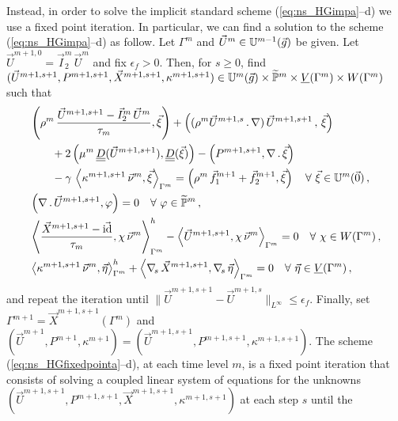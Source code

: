 Instead, in order to solve the implicit standard scheme (\ref{eq:ns_HGimpa}--d)
we use a fixed point iteration. In particular, we can find a solution
to the scheme (\ref{eq:ns_HGimpa}--d) as follow.
Let $\Gamma^m$ and $\vec U^m\in \uspacedisc{g}{m-1}$ be given.
Let $\vec U^{m+1,0}=\vec I^m_2\,\vec U^m$ and fix $\epsilon_f > 0$.
Then, for $s \geq 0$,
find $(\vec U^{m+1,s+1},P^{m+1,s+1}, \vec X^{m+1,s+1}, \kappa^{m+1,s+1}) \in
\uspacedisc{g}{m}\times \pnormspace^m \times \Vh \times \Wh$ such that
\begin{subequations}
\begin{align}
& \left( \rho^m\,\frac{\vec U^{m+1,s+1} - \vec I^m_2\,\vec U^m}{\tau_m}, \vec
\xi \right) + \left((\rho^m\vec U^{m+1,s}\,.\,\nabla)\,\vec U^{m+1,s+1}\,,
\,\vec \xi \right)\nonumber \\
&\qquad + 2\left(\mu^m\,\mat D(\vec U^{m+1,s+1}), \mat D(\vec \xi) \right)
- \left(P^{m+1,s+1}, \nabla\,.\,\vec \xi\right) \nonumber \\
& \qquad - \gamma\,
\left\langle \kappa^{m+1,s+1}\,\vec\nu^m,\vec\xi\right\rangle_{\Gamma^m}
= \left(\rho^m\,\vec f_1^{m+1}+\vec f_2^{m+1}, \vec \xi\right)
\quad \forall\ \vec\xi \in \uspacedisc{0}{m}\,, \label{eq:ns_HGfixedpointa} \\
& \left(\nabla\,.\,\vec U^{m+1,s+1}, \varphi\right)  = 0
\quad \forall\ \varphi \in \pnormspace^m\,,\label{eq:ns_HGfixedpointb} \\
&  \left\langle \frac{\vec X^{m+1,s+1} - \vec\id}{\tau_m} ,\chi\,\vec\nu^m
\right\rangle_{\Gamma^m}^h - \left\langle \vec U^{m+1,s+1}, \chi\,\vec\nu^m
\right\rangle_{\Gamma^m}  = 0 \quad \forall\ \chi \in \Wh\,,
\label{eq:ns_HGfixedpointc}\\
& \left\langle \kappa^{m+1,s+1}\,\vec\nu^m, \vec\eta \right\rangle_{\Gamma^m}^h
+ \left\langle \nabs\,\vec X^{m+1,s+1}, \nabs\,\vec \eta
\right\rangle_{\Gamma^m} = 0 \quad \forall\ \vec\eta \in \Vh\,,
\label{eq:ns_HGfixedpointd}
\end{align}
\end{subequations}
and repeat the iteration until $\|\vec U^{m+1,s+1}-\vec U^{m+1,s}\|_{L^\infty}
\leq\epsilon_f$. Finally, set ${\Gamma^{m+1}=\vec X^{m+1,s+1}(\Gamma^m)}$
and $(\vec U^{m+1}, P^{m+1}, \kappa^{m+1}) = (\vec U^{m+1,s+1}, P^{m+1,s+1},
\kappa^{m+1,s+1})$. The scheme (\ref{eq:ns_HGfixedpointa}--d), at each time
level $m$, is a fixed point iteration that consists of solving a coupled
linear system of equations for the unknowns $(\vec U^{m+1,s+1}, P^{m+1,s+1},
\vec X^{m+1,s+1}, \kappa^{m+1,s+1})$ at each step $s$ until the
